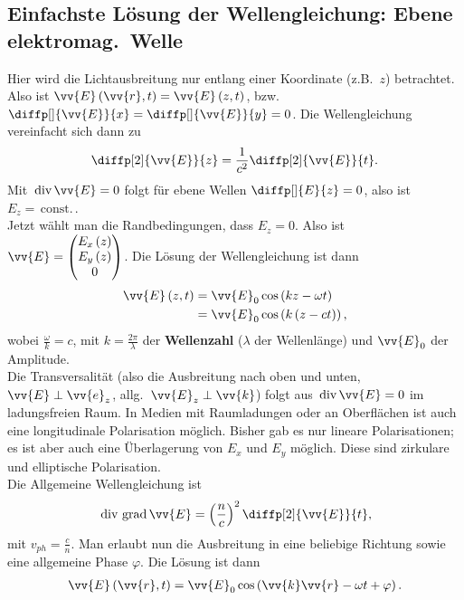 \documentclass[a4paper,12pt]{article}
\numberwithin{equation}{section}
\begin{document}
\subsection{Einfachste Lösung der Wellengleichung: Ebene elektromag.\ Welle}
Hier wird die Lichtausbreitung nur entlang einer Koordinate (z.B.\ $z$) betrachtet. Also ist $\vv{E}\left(\vv{r},t\right)=\vv{E}\left(z,t\right)$, bzw.\ $\diffp[]{\vv{E}}{x}=\diffp[]{\vv{E}}{y}=0$. Die Wellengleichung vereinfacht sich dann zu
\begin{align} 
        \diffp[2]{\vv{E}}{z}=\dfrac{1}{c^2}\diffp[2]{\vv{E}}{t}
.\end{align} 
Mit $\,\text{div}\,\vv{E}=0$ folgt für ebene Wellen $\diffp[]{E}{z}=0$, also ist $E_z=\,\text{const.}\,$.\\\indent
Jetzt wählt man die Randbedingungen, dass $E_z=0$. Also ist $\vv{E}=\begin{pmatrix}
        E_x\left(z\right)\\E_y\left(z\right)\\0
\end{pmatrix}$. Die Lösung der Wellengleichung ist dann
\begin{align} 
        \vv{E}\left(z,t\right)&=\vv{E}_0\cos \left(kz-\omega t\right)\\
                              &=\vv{E}_0\cos \left(k\left(z-ct\right)\right)
,\end{align} 
wobei $\tfrac{\omega }{k}=c$, mit $k=\tfrac{2\pi }{\lambda }$ der \textbf{Wellenzahl} ($\lambda $ der Wellenlänge) und $\vv{E}_0$ der Amplitude.\\\indent
Die Transversalität (also die Ausbreitung nach oben und unten, $\vv{E}\perp \vv{e}_z$, allg.\ $\vv{E}_z\perp \vv{k}$) folgt aus $\,\text{div}\,\vv{E}=0$ im ladungsfreien Raum. In Medien mit Raumladungen oder an Oberflächen ist auch eine longitudinale Polarisation möglich. Bisher gab es nur lineare Polarisationen; es ist aber auch eine Überlagerung von $E_x$ und $E_y$ möglich. Diese sind zirkulare und elliptische Polarisation.\\\indent
Die Allgemeine Wellengleichung ist
\begin{align} 
        \,\text{div}\,\,\text{grad}\,\vv{E}=\left(\dfrac{n}{c}\right)^2\diffp[2]{\vv{E}}{t}
,\end{align} 
mit $v_{ph}=\tfrac{c}{n}$. Man erlaubt nun die Ausbreitung in eine beliebige Richtung sowie eine allgemeine Phase $\varphi $. Die Lösung ist dann
\begin{align} 
        \vv{E}\left(\vv{r},t\right)=\vv{E}_0\cos \left(\vv{k}\vv{r}-\omega t+\varphi \right)
.\end{align} 
\end{document}

